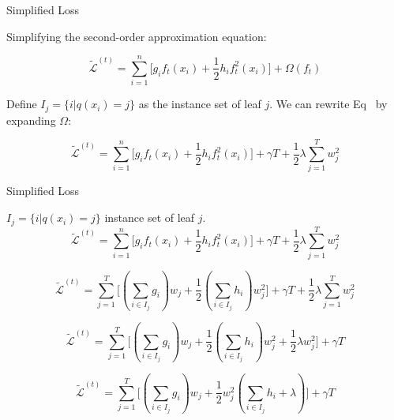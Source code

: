 \documentclass{beamer}
\begin{document}
\begin{frame}{Simplified Loss}
	
	Simplifying the second-order approximation equation:
	
	\begin{equation}
		\label{eq:simpleloss}
		\tilde{\mathcal{L}}^{(t)} = \sum_{i=1}^{n}
		\big[ 
			g_i f_t(x_i) + \frac{1}{2} h_i f_t^2(x_i)
		\big]
		 + \Omega(f_t)
	\end{equation}
	
	Define $I_j = \{ i | q(x_i) = j \}$ as the instance set of leaf $j$. 
	We can rewrite Eq~ by expanding $\Omega$:
	
	\begin{equation*}
		\tilde{\mathcal{L}}^{(t)} = \sum_{i=1}^{n}
		\big[ 
		g_i f_t(x_i) + \frac{1}{2} h_i f_t^2(x_i)
		\big]
		+ \gamma T
		+ \frac{1}{2} \lambda \sum_{j=1}^{T} w_j^2
	\end{equation*}
		
\end{frame}

\begin{frame}{Simplified Loss}
	
	$I_j = \{ i | q(x_i) = j \}$ instance set of leaf $j$.
	\begin{equation*}
	\tilde{\mathcal{L}}^{(t)} = \sum_{i=1}^{n}
	\big[ 
	g_i f_t(x_i) + \frac{1}{2} h_i f_t^2(x_i)
	\big]
	+ \gamma T
	+ \frac{1}{2} \lambda \sum_{j=1}^{T} w_j^2
	\end{equation*}
	
	\begin{equation*}
	\tilde{\mathcal{L}}^{(t)} = \sum_{j=1}^{T}
	\big[ 
	(\sum_{i \in I_j}g_i ) w_j + 
	\frac{1}{2} (\sum_{i \in I_j} h_i) w_j^2 
	\big]
	+ \gamma T
	+ \frac{1}{2} \lambda \sum_{j=1}^{T} w_j^2
	\end{equation*}
	
	\begin{equation*}
	\tilde{\mathcal{L}}^{(t)} = \sum_{j=1}^{T}
	\big[ 
	(\sum_{i \in I_j}g_i ) w_j + 
	\frac{1}{2} (\sum_{i \in I_j} h_i) w_j^2 +
	\frac{1}{2} \lambda w_j^2
	\big]
	+ \gamma T
	\end{equation*}
	
	\begin{equation*}
	\tilde{\mathcal{L}}^{(t)} = \sum_{j=1}^{T}
	\big[ 
	(\sum_{i \in I_j}g_i ) w_j + 
	\frac{1}{2} w_j^2 (\sum_{i \in I_j} h_i + \lambda)
	\big]
	+ \gamma T
	\end{equation*}
		
\end{frame}
\end{document}
